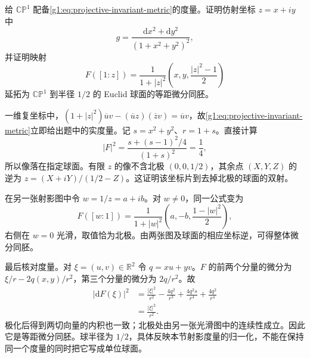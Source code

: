 \begin{exercise}\label{g1:ex:projective-line-radius}
	给 \(\mathbb{CP}^1\) 配备\eqref{g1:eq:projective-invariant-metric}的度量。证明仿射坐标 \(z=x+iy\) 中
	\[
		g=\frac{\mathrm{d}x^2+\mathrm{d}y^2}{(1+x^2+y^2)^2},
	\]
	并证明映射
	\[
		F([1:z])=\frac1{1+|z|^2}
		\left(x,y,\frac{|z|^2-1}{2}\right)
	\]
	延拓为 \(\mathbb{CP}^1\) 到半径 \(1/2\) 的 Euclid 球面的等距微分同胚。
\end{exercise}
\begin{solution}
	一维复坐标中，\((1+|z|^2)\overline uv-(\overline uz)(\overline zv)=\overline uv\)，故\eqref{g1:eq:projective-invariant-metric}立即给出题中的实度量。记 \(s=x^2+y^2\)、\(r=1+s\)。直接计算
	\[
		|F|^2=\frac{s+(s-1)^2/4}{(1+s)^2}=\frac14,
	\]
	所以像落在指定球面。有限 \(z\) 的像不含北极 \((0,0,1/2)\)，其余点 \((X,Y,Z)\) 的逆为 \(z=(X+iY)/(1/2-Z)\)。这证明该坐标片到去掉北极的球面的双射。

	在另一张射影图中令 \(w=1/z=a+ib\)。对 \(w\ne0\)，同一公式变为
	\[
		F([w:1])=\frac1{1+|w|^2}
		\left(a,-b,\frac{1-|w|^2}{2}\right),
	\]
	右侧在 \(w=0\) 光滑，取值恰为北极。由两张图及球面的相应坐标逆，可得整体微分同胚。

	最后核对度量。对 \(\xi=(u,v)\in\mathbb R^2\) 令 \(q=xu+yv\)。\(F\) 的前两个分量的微分为 \(\xi/r-2q(x,y)/r^2\)，第三个分量的微分为 \(2q/r^2\)。故
	\begin{align*}
		|\mathrm{d}F(\xi)|^2
		&=\frac{|\xi|^2}{r^2}-\frac{4q^2}{r^3}
		+\frac{4q^2s}{r^4}+\frac{4q^2}{r^4}\\
		&=\frac{|\xi|^2}{r^2}.
	\end{align*}
	极化后得到两切向量的内积也一致；北极处由另一张光滑图中的连续性成立。因此它是等距微分同胚。球半径为 \(1/2\)，具体反映本节射影度量的归一化，不能在保持同一个度量的同时把它写成单位球面。
\end{solution}

